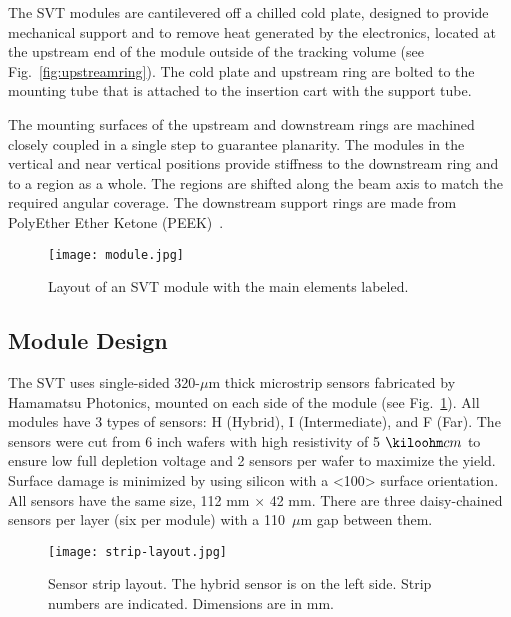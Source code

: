  The SVT modules are cantilevered off a chilled cold plate, designed to provide mechanical support and to remove heat generated by the electronics, located at the upstream end of the module outside of the tracking volume (see Fig.~\ref{fig:upstreamring}). The cold plate and upstream ring are bolted to the mounting tube that is attached to the insertion cart with the support tube. 
 
The mounting surfaces of the upstream and downstream rings are machined closely coupled in a single step to guarantee planarity. The modules in the vertical and near vertical positions provide stiffness to the downstream ring and to a region as a whole. The regions are shifted along the beam axis to match the required angular coverage. The downstream support rings are made from PolyEther Ether Ketone (PEEK)~\cite{NIMVCC}. 

\begin{figure}[h] 
\centering 
\texttt{[image: module.jpg]}
\caption{Layout of an SVT module with the main elements labeled.}
\label{fig:module}
\end{figure}

\subsection{Module Design}

The SVT uses single-sided 320-$\mu$m thick microstrip sensors fabricated by Hamamatsu Photonics, mounted on each side of the module (see Fig.~\ref{fig:module}). All modules have 3 types of sensors: H (Hybrid), I (Intermediate), and F (Far). The sensors were cut from 6 inch wafers with high resistivity of 5 $\kiloohm cm$ to ensure low full depletion voltage and 2 sensors per wafer to maximize the yield. Surface damage is minimized by using silicon with a <100> surface orientation. All sensors have the same size, 112 mm $\times$ 42 mm. There are three daisy-chained sensors per layer (six per module) with a 110~$\mu$m gap between them. 

\begin{figure}[h] 
\centering 
\texttt{[image: strip-layout.jpg]}
\caption{Sensor strip layout. The hybrid sensor is on the left side. Strip numbers are indicated. Dimensions are in mm.}
\label{fig:strip-layout}
\end{figure}

